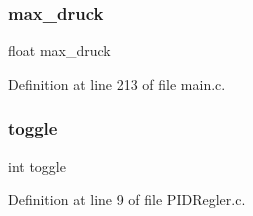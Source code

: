 \mbox{\label{_p_i_d_regler_8c_a4403857d84098dcee3088f476a2a2b34}} 
\subsubsection{max\+\_\+druck}
{\footnotesize\ttfamily float max\+\_\+druck}



Definition at line 213 of file main.\+c.

\mbox{\label{_p_i_d_regler_8c_a5fb7c572958b9d030934749cdd2f178e}} 
\subsubsection{toggle}
{\footnotesize\ttfamily int toggle}



Definition at line 9 of file P\+I\+D\+Regler.\+c.

